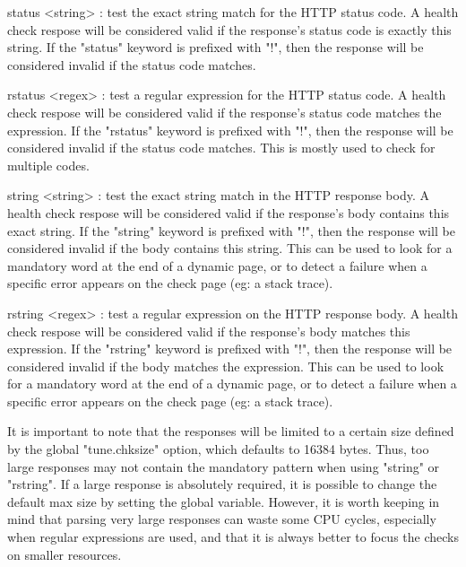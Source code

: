     status <string> : test the exact string match for the HTTP status code.
                      A health check respose will be considered valid if the
                      response's status code is exactly this string. If the
                      "status" keyword is prefixed with "!", then the response
                      will be considered invalid if the status code matches.

    rstatus <regex> : test a regular expression for the HTTP status code.
                      A health check respose will be considered valid if the
                      response's status code matches the expression. If the
                      "rstatus" keyword is prefixed with "!", then the response
                      will be considered invalid if the status code matches.
                      This is mostly used to check for multiple codes.

    string <string> : test the exact string match in the HTTP response body.
                      A health check respose will be considered valid if the
                      response's body contains this exact string. If the
                      "string" keyword is prefixed with "!", then the response
                      will be considered invalid if the body contains this
                      string. This can be used to look for a mandatory word at
                      the end of a dynamic page, or to detect a failure when a
                      specific error appears on the check page (eg: a stack
                      trace).

    rstring <regex> : test a regular expression on the HTTP response body.
                      A health check respose will be considered valid if the
                      response's body matches this expression. If the "rstring"
                      keyword is prefixed with "!", then the response will be
                      considered invalid if the body matches the expression.
                      This can be used to look for a mandatory word at the end
                      of a dynamic page, or to detect a failure when a specific
                      error appears on the check page (eg: a stack trace).

  It is important to note that the responses will be limited to a certain size
  defined by the global "tune.chksize" option, which defaults to 16384 bytes.
  Thus, too large responses may not contain the mandatory pattern when using
  "string" or "rstring". If a large response is absolutely required, it is
  possible to change the default max size by setting the global variable.
  However, it is worth keeping in mind that parsing very large responses can
  waste some CPU cycles, especially when regular expressions are used, and that
  it is always better to focus the checks on smaller resources.

